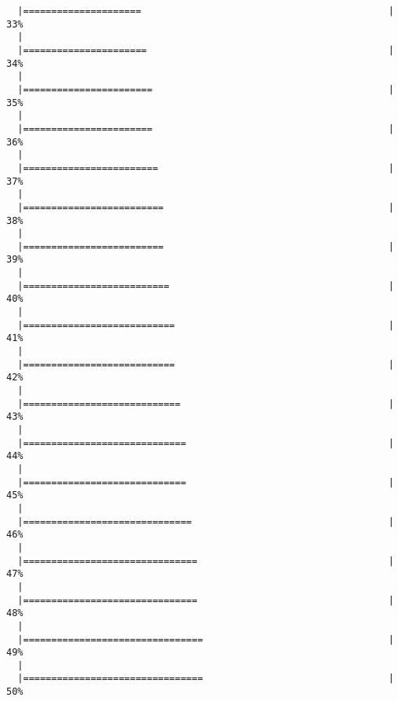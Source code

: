 \documentclass[]{article}
\begin{document}
\begin{verbatim}
  |=====================                                            |  33%
  |                                                                       
  |======================                                           |  34%
  |                                                                       
  |=======================                                          |  35%
  |                                                                       
  |=======================                                          |  36%
  |                                                                       
  |========================                                         |  37%
  |                                                                       
  |=========================                                        |  38%
  |                                                                       
  |=========================                                        |  39%
  |                                                                       
  |==========================                                       |  40%
  |                                                                       
  |===========================                                      |  41%
  |                                                                       
  |===========================                                      |  42%
  |                                                                       
  |============================                                     |  43%
  |                                                                       
  |=============================                                    |  44%
  |                                                                       
  |=============================                                    |  45%
  |                                                                       
  |==============================                                   |  46%
  |                                                                       
  |===============================                                  |  47%
  |                                                                       
  |===============================                                  |  48%
  |                                                                       
  |================================                                 |  49%
  |                                                                       
  |================================                                 |  50%

\end{verbatim}
\end{document}
